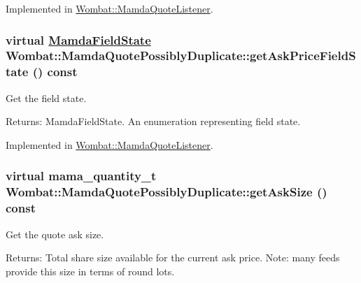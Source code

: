 Implemented in \hyperlink{classWombat_1_1MamdaQuoteListener_b4c49376d3d07db48065adc6d74da196}{Wombat::Mamda\-Quote\-Listener}.\hypertarget{classWombat_1_1MamdaQuotePossiblyDuplicate_40e92e9acd45a2939ade49dd79a011e4}{
\subsubsection[getAskPriceFieldState]{\setlength{\rightskip}{0pt plus 5cm}virtual \hyperlink{namespaceWombat_93aac974f2ab713554fd12a1fa3b7d2a}{Mamda\-Field\-State} Wombat::Mamda\-Quote\-Possibly\-Duplicate::get\-Ask\-Price\-Field\-State () const}}
\label{classWombat_1_1MamdaQuotePossiblyDuplicate_40e92e9acd45a2939ade49dd79a011e4}


Get the field state. 

\begin{Desc}
\item[Returns:]Mamda\-Field\-State. An enumeration representing field state. \end{Desc}


Implemented in \hyperlink{classWombat_1_1MamdaQuoteListener_28dd174c3b718a3def1d09b04ab68577}{Wombat::Mamda\-Quote\-Listener}.\hypertarget{classWombat_1_1MamdaQuotePossiblyDuplicate_a0e6687f8fc0a54991355e06ddd964e9}{
\subsubsection[getAskSize]{\setlength{\rightskip}{0pt plus 5cm}virtual mama\_\-quantity\_\-t Wombat::Mamda\-Quote\-Possibly\-Duplicate::get\-Ask\-Size () const}}
\label{classWombat_1_1MamdaQuotePossiblyDuplicate_a0e6687f8fc0a54991355e06ddd964e9}


Get the quote ask size. 

\begin{Desc}
\item[Returns:]Total share size available for the current ask price. Note: many feeds provide this size in terms of round lots. \end{Desc}


